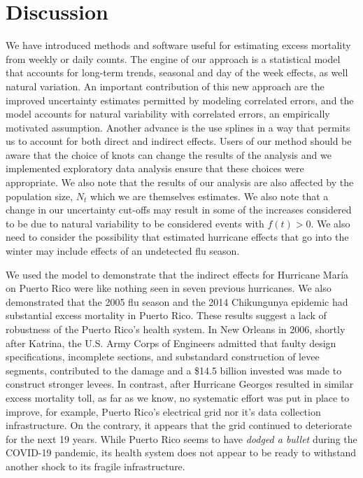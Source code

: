 \documentclass[11pt]{article}
\begin{document}
\section{Discussion}
We have introduced methods and software useful for estimating excess mortality from weekly or daily counts. The engine of our approach is a statistical model that accounts for long-term trends, seasonal and day of the week effects, as well natural variation. An important contribution of this new approach are the improved uncertainty estimates permitted by modeling correlated errors, and 
the model accounts for natural variability with correlated errors, an empirically motivated assumption. Another advance is the use splines in a way that permits us to account for both direct and indirect effects. Users of our method should be aware that the choice of knots can change the results of the analysis and we implemented exploratory data analysis ensure that these choices were appropriate. We also note that the results of our analysis are also affected by the population size, $N_t$ which we are themselves estimates. We also note that a change in our uncertainty cut-offs may result in some of the increases considered to be due to natural variability to be considered events with $f(t)>0$. We also need to consider the possibility that estimated hurricane effects that go into the winter may include effects of an undetected flu season.

We used the model to demonstrate that the indirect effects for Hurricane Mar\'ia on Puerto Rico were like nothing seen in seven previous hurricanes. We also demonstrated that the 2005 flu season and the 2014 Chikungunya epidemic had substantial excess mortality in Puerto Rico. These results suggest a lack of robustness of the Puerto Rico's health system. In New Orleans in 2006, shortly after Katrina,
the U.S. Army Corps of Engineers admitted that faulty design specifications, incomplete sections,
and substandard construction of levee segments, contributed to the damage and a \$14.5 billion invested was made to construct stronger levees. In contrast, after Hurricane Georges resulted in similar excess mortality toll, as far as we know, no systematic effort was put in place to improve, for example, Puerto Rico’s electrical grid nor it's data collection infrastructure. On the contrary, it appears that the grid continued to deteriorate for the next 19 years. While Puerto Rico seems to have \emph{dodged a bullet} during the COVID-19 pandemic, its health system does not appear to be ready to withstand another shock to its fragile infrastructure.
\end{document}
